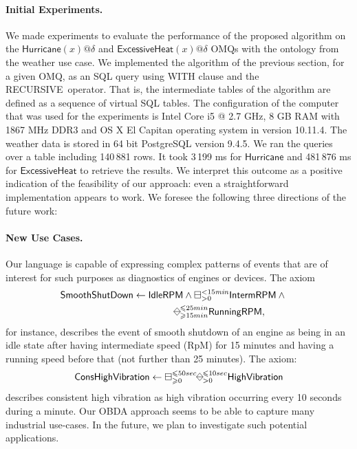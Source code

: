 \documentclass{article}
\newcommand{\diamondminus}{%
  \raisebox{-.15ex}{\begin{tikzpicture}
    \useasboundingbox (-0.7ex, -0.9ex) rectangle (0.7ex, 0.9ex);
    \node (w) at (-0.8ex,0) {};
    \node (e) at (+0.8ex,0) {};
    \node (s) at (0,-.9ex) {};
    \node (n) at (0,+.9ex) {};
    \draw (n.center) -- (e.center) -- (s.center) -- (w.center) -- (n.center);
    \draw (e.center) -- (w.center);
  \end{tikzpicture}}}
\begin{document}
{{\paragraph{Initial Experiments.} We made experiments to evaluate the
performance of the proposed algorithm on the
$\mathsf{Hurricane}(x)@\delta$ and $\mathsf{ExcessiveHeat}(x)@\delta$
OMQs with the ontology from the weather use case. We implemented the
algorithm of the previous section, for a given OMQ, as an SQL query
using {\sf WITH} clause and the {\sf RECURSIVE}~operator. That is, the
intermediate tables of the algorithm are defined as a sequence of
virtual SQL tables. The configuration of the computer that was used
for the experiments is Intel Core i5 @ 2.7 GHz, 8 GB RAM with 1867 MHz
DDR3 and OS X El Capitan operating system in version 10.11.4. The
weather data is stored in 64 bit PostgreSQL version 9.4.5. We ran
the queries over a table including 140\,881 rows. It took 3\,199 ms for
$\mathsf{Hurricane}$ and 481\,876 ms for $\mathsf{ExcessiveHeat}$ to
retrieve the results. We interpret this outcome as a positive
indication of the feasibility of our approach: even a straightforward
implementation appears to work. We foresee the following three
directions of the future work:

\paragraph{New Use Cases.} Our language is capable of expressing complex patterns of events that are of interest for such purposes as diagnostics of engines or devices. The axiom
%
\begin{multline*}
{\sf SmoothShutDown} \leftarrow {\sf IdleRPM} \land  \boxminus^{< 15{\it min}}_{>0} {\sf IntermRPM} \land{} \quad\mbox{}  \\
\mbox{} \hspace*{3cm} \diamondminus^{\leqslant 25min}_{\geqslant 15min} {\sf RunningRPM},
\end{multline*}
%
for instance, describes the event of smooth shutdown of an engine as being in an idle state after having intermediate speed (RpM) for 15 minutes and having a running speed before that (not further than 25 minutes). The axiom:
%
\begin{align*}
   {\sf ConsHighVibration} \leftarrow \boxminus^{\leqslant 50 sec}_{\geqslant 0} \diamondminus^{\leqslant 10 sec}_{>0} {\sf HighVibration}
\end{align*}
%
describes consistent high vibration as high vibration occurring every 10 seconds during a minute. Our OBDA approach seems to be able to capture many industrial use-cases. In the future, we plan to investigate such potential applications.

}}
\end{document}
